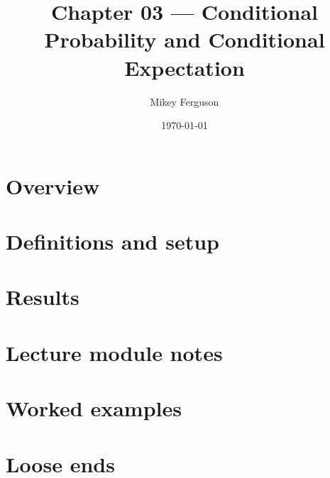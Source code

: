 \documentclass[11pt]{article}
\title{Chapter 03 --- Conditional Probability and Conditional Expectation}
\author{Mikey Ferguson}
\date{\today}
\begin{document}
\maketitle
\tableofcontents
\bigskip

\section{Overview}

\section{Definitions and setup}

\section{Results}

\section{Lecture module notes}

\section{Worked examples}

\section{Loose ends}
\end{document}
